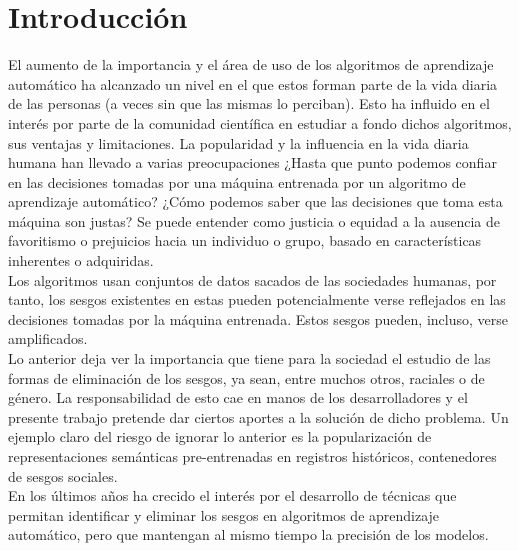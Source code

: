 \chapter*{Introducción}\label{chapter:introduction}

El aumento de la importancia y el área de uso de los algoritmos de aprendizaje automático ha alcanzado un nivel en el que estos forman parte de la vida diaria de las personas (a veces sin que las mismas lo perciban). Esto ha influido en el interés por parte de la comunidad científica en estudiar a fondo dichos algoritmos, sus ventajas y limitaciones. La popularidad y la influencia en la vida diaria humana han llevado a varias preocupaciones ¿Hasta que punto podemos confiar en las decisiones tomadas por una máquina entrenada por un algoritmo de aprendizaje automático? ¿Cómo podemos saber que las decisiones que toma esta máquina son justas? Se puede entender como justicia o equidad a la ausencia de favoritismo o prejuicios hacia un individuo o grupo, basado en características inherentes o adquiridas.\\
Los algoritmos usan conjuntos de datos sacados de las sociedades humanas, por tanto, los sesgos existentes en estas pueden potencialmente verse reflejados en las decisiones tomadas por la máquina entrenada. Estos sesgos pueden, incluso, verse amplificados.\\
Lo anterior deja ver la importancia que tiene para la sociedad el estudio de las formas de eliminación de los sesgos, ya sean, entre muchos otros, raciales o de género. La responsabilidad de esto cae en manos de los desarrolladores y el presente trabajo pretende dar ciertos aportes a la solución de dicho problema. Un ejemplo claro del riesgo de ignorar lo anterior es la popularización de representaciones semánticas pre-entrenadas en registros históricos, contenedores de sesgos sociales.\\
En los últimos años ha crecido el interés por el desarrollo de técnicas que permitan identificar y eliminar los sesgos en algoritmos de aprendizaje automático, pero que mantengan al mismo tiempo la precisión de los modelos.\\

